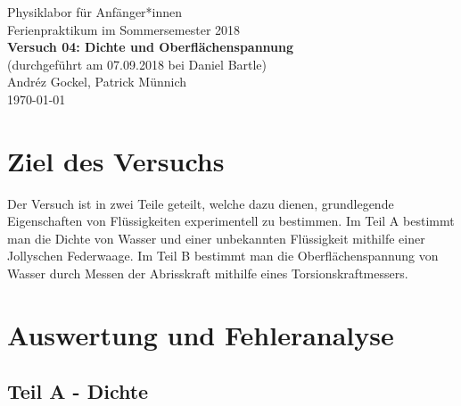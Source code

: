 \documentclass[11pt,a4paper]{article}
\begin{document}
\thispagestyle{empty}
{
\centering 
\large 
Physiklabor für Anf\"anger*innen \\
Ferienpraktikum im Sommersemester 2018 \\[4mm]
\textbf{\LARGE 
Versuch 04: Dichte und Oberflächenspannung
} \\[3mm]
(durchgef\"uhrt am 07.09.2018 bei Daniel Bartle) \\
Andréz Gockel, Patrick M\"unnich\\
\today \\[10mm]
}

\section{Ziel des Versuchs}

Der Versuch ist in zwei Teile geteilt, welche dazu dienen, grundlegende Eigenschaften von Fl\"ussigkeiten experimentell zu bestimmen. Im Teil A bestimmt man die Dichte von Wasser und einer unbekannten Fl\"ussigkeit mithilfe einer Jollyschen Federwaage. Im Teil B bestimmt man die Oberfl\"achen\-spannung von Wasser durch Messen der Abrisskraft mithilfe eines Torsionskraftmessers.

\section{Auswertung und Fehleranalyse}


\subsection{Teil A - Dichte}
\end{document}
